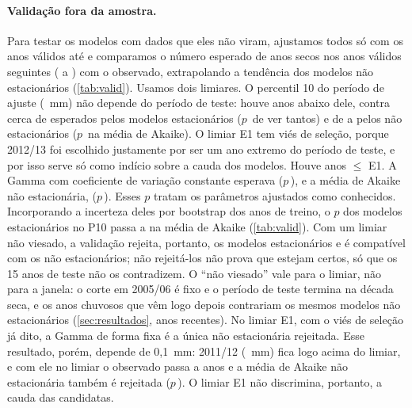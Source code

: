 \documentclass[11pt,a4paper]{article}
\begin{document}
\paragraph{Validação fora da amostra.} Para testar os modelos com dados que eles não viram,
ajustamos todos só com os \NTreino{} anos válidos até \AnoCorteValidacao{} e comparamos o número
esperado de anos secos nos \NTeste{} anos válidos seguintes (\PrimeiroAnoTeste{} a
\UltimoAnoTeste{}) com o observado, extrapolando a tendência dos modelos não estacionários
(\cref{tab:valid}). Usamos dois limiares. O percentil 10 do período de ajuste
(\LimiarPdez{}~mm) não depende do período de teste: houve \ObsPdez{} anos abaixo dele, contra
cerca de \EspPdezEstMedia{} esperados pelos modelos estacionários ($p$\,\PObsPdezEstMedia{} de ver
tantos) e de \EspPdezNSGamma{} a \EspPdezNSMedia{} pelos não estacionários
($p$\,\PObsPdezNSMedia{} na média de Akaike). O limiar E1 tem viés de seleção, porque 2012/13 foi
escolhido justamente por ser um ano extremo do período de teste, e por isso serve só como
indício sobre a cauda dos modelos. Houve \ObsEum{} anos $\le$ E1. A Gamma com coeficiente de variação constante
esperava \EspEumNSGamma{} ($p$\,\PObsEumNSGamma), e a média de Akaike não estacionária,
\EspEumNSMedia{} ($p$\,\PObsEumNSMedia). Esses $p$ tratam os parâmetros ajustados como
conhecidos. Incorporando a incerteza deles por bootstrap dos anos de treino, o $p$ dos modelos
estacionários no P10 passa a \PPredObsPdezEstMediaVal{} na média de Akaike (\cref{tab:valid}). Com
um limiar não viesado, a validação rejeita, portanto, os modelos estacionários e é compatível com
os não estacionários; não rejeitá-los não prova que estejam certos, só que os 15 anos de teste não
os contradizem. O ``não viesado'' vale para o limiar, não para a janela: o corte em 2005/06 é fixo
e o período de teste termina na década seca, e os anos chuvosos que vêm logo depois contrariam os
mesmos modelos não estacionários (\cref{sec:resultados}, anos recentes). No limiar E1, com o viés de seleção já dito, a Gamma de forma fixa é a única
não estacionária rejeitada. Esse resultado, porém, depende de 0,1~mm: 2011/12 (\ChuvaOnzeDoze{}~mm) fica
logo acima do limiar, e com ele no limiar o observado passa a \ObsEumb{} anos e a média de Akaike não
estacionária também é rejeitada ($p$\,\PObsEumbNSMedia). O limiar E1 não discrimina, portanto, a cauda
das candidatas.
\end{document}
